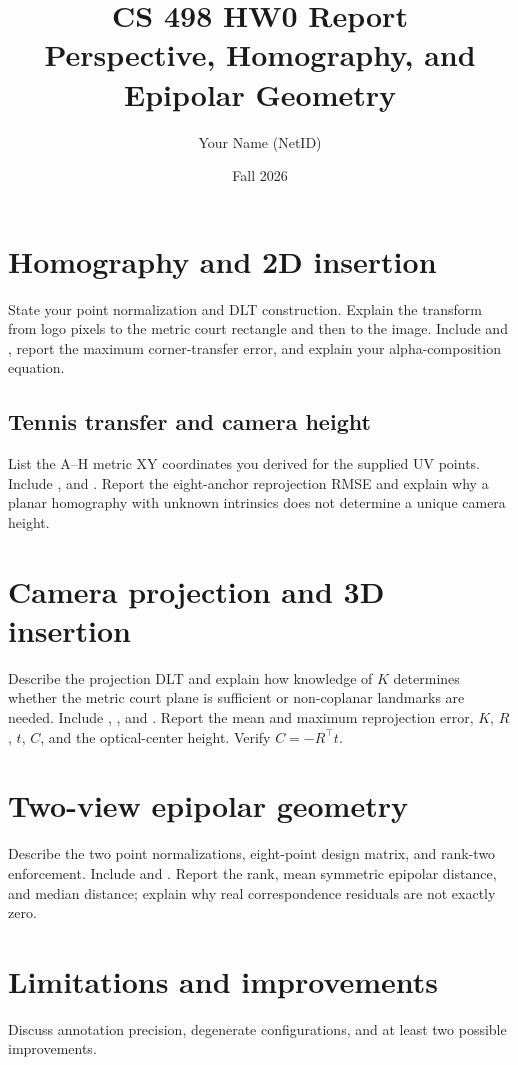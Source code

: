\documentclass[11pt]{article}
\title{CS 498 HW0 Report\\Perspective, Homography, and Epipolar Geometry}
\author{Your Name (NetID)}
\date{Fall 2026}
\begin{document}
\maketitle

\section{Homography and 2D insertion}
State your point normalization and DLT construction. Explain the transform
from logo pixels to the metric court rectangle and then to the image. Include
 and
, report the maximum corner-transfer
error, and explain your alpha-composition equation.

\subsection{Tennis transfer and camera height}
List the A--H metric XY coordinates you derived for the supplied UV points. Include
,
 and
. Report the eight-anchor reprojection RMSE and explain why
a planar homography with unknown intrinsics does not determine a unique camera
height.

\section{Camera projection and 3D insertion}
Describe the projection DLT and explain how knowledge of $K$ determines whether
the metric court plane is sufficient or non-coplanar landmarks are needed.
Include ,
, and . Report
the mean and maximum reprojection error, $K$, $R$, $t$, $C$, and the optical-center
height. Verify $C=-R^\top t$.

\section{Two-view epipolar geometry}
Describe the two point normalizations, eight-point design matrix, and rank-two
enforcement. Include  and
. Report the rank, mean symmetric epipolar
distance, and median distance; explain why real correspondence residuals are
not exactly zero.

\section{Limitations and improvements}
Discuss annotation precision, degenerate configurations, and at least two
possible improvements.
\end{document}
